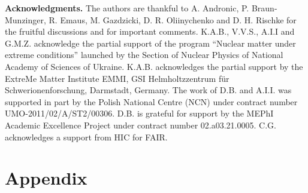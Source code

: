\documentclass[12pt]{article}
\begin{document}
\vspace*{2.2mm}

\noindent 
{\bf Acknowledgments.}
The authors  are   thankful to A. Andronic,  P. Braun-Munzinger, R. Emaus, M. Gazdzicki, D. R. Oliinychenko and  D. H. Rischke    for the fruitful discussions and for important  comments. K.A.B., V.V.S., A.I.I and G.M.Z. acknowledge the  partial support of the program ``Nuclear matter under extreme conditions''  launched by the Section of Nuclear Physics of National Academy of Sciences  of Ukraine. 
K.A.B. acknowledges the partial support by the ExtreMe Matter Institute EMMI, GSI Helmholtzzentrum f\"ur Schwerionenforschung, Darmstadt, Germany. 
The work of D.B. and A.I.I. was supported in part by the Polish National Centre (NCN) under contract number UMO-2011/02/A/ST2/00306. D.B. is grateful for support by the MEPhI Academic Excellence Project under contract
number 02.a03.21.0005.  C.G. acknowledges a support from HIC for FAIR.




\appendix



\section{Appendix}
\end{document}
